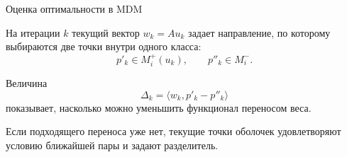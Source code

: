\SPBGContentSlide
  {Оценка оптимальности в MDM}
  {%
    \FormulaBody
    На итерации \(k\) текущий вектор \(w_k=Au_k\) задает направление,
    по которому выбираются две точки внутри одного класса:
    \[
      p'_k\in M_i^+(u_k),
      \qquad
      p''_k\in M_i^-.
    \]

    Величина
    \[
      \Delta_k=
      \langle w_k,p'_k-p''_k\rangle
    \]
    показывает, насколько можно уменьшить функционал переносом веса.

    \Body
    Если подходящего переноса уже нет, текущие точки оболочек удовлетворяют
    условию ближайшей пары и задают разделитель.
  }

